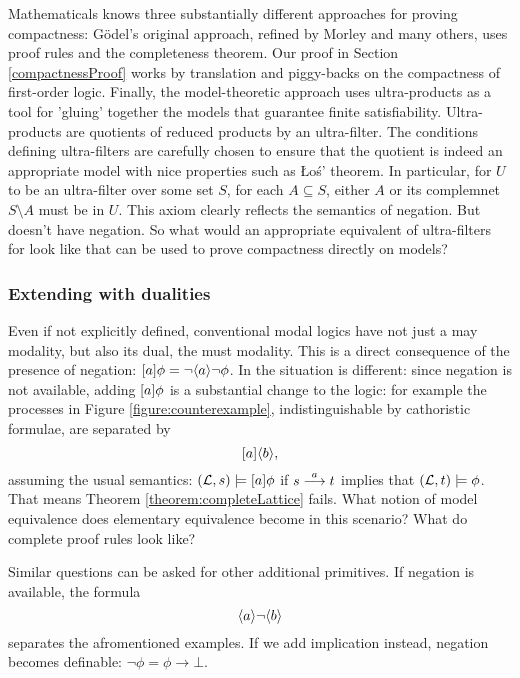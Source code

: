 Mathematicals knows three substantially different approaches for
proving compactness: G\"odel's original approach, refined by Morley
and many others, uses proof rules and the completeness theorem.  Our
proof in Section \ref{compactnessProof} works by translation and
piggy-backs on the compactness of first-order logic. Finally, the
model-theoretic approach uses ultra-products as a tool for 'gluing'
together the models that guarantee finite
satisfiability. Ultra-products are quotients of reduced products by an
ultra-filter. The conditions defining ultra-filters are carefully
chosen to ensure that the quotient is indeed an appropriate model with
nice properties such as \L{}o\'{s}' theorem. In particular, for $U$ to
be an ultra-filter over some set $S$, for each $A \subseteq S$, either
$A$ or its complemnet $S\setminus A$ must be in $U$. This axiom
clearly reflects the semantics of negation. But \cathoristic{} doesn't
have negation. So what would an appropriate equivalent of
ultra-filters for \cathoristic{} look like that can be used to prove
compactness directly on models?

\subsubsection{Extending \cathoristic{} with dualities}

Even if not explicitly defined, conventional modal logics have not
just a may modality, but also its dual, the must modality. This is a
direct consequence of the presence of negation: $[ a ] \phi = \neg
\langle a \rangle \neg \phi$. In \cathoristic{} the situation is different: since
negation is not available, adding $[ a ] \phi$ is a substantial
change to the logic: for example the processes in Figure
\ref{figure:counterexample}, indistinguishable by cathoristic formulae, are
separated by
  \[
     [ a ] \langle b \rangle,
  \]
  assuming the usual semantics: $(\mathcal{L}, s) \models [ a ] \phi$ if
  $s \stackrel{a}{\longrightarrow} t$ implies that $(\mathcal{L}, t) \models \phi$. That means
  Theorem \ref{theorem:completeLattice} fails. What notion of model
  equivalence does elementary equivalence become in this scenario?
  What do complete proof rules look like?

  Similar questions can be asked for other additional primitives. If negation is 
  available, the formula
  \[
     \langle a \rangle \neg \langle b \rangle
  \]
  separates the afromentioned examples. If we add implication instead,
  negation becomes definable: $\neg \phi = \phi \rightarrow \bot$.




